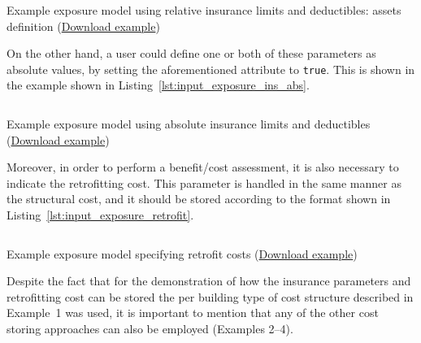 \begin{listing}[htbp]
  \inputminted[firstline=22,firstnumber=22,lastline=32,fontsize=\footnotesize,frame=single,linenos,bgcolor=lightgray]{xml}{oqum/risk/Verbatim/input_exposure_ins_rel.xml}
  \caption{Example exposure model using relative insurance limits and deductibles: assets definition (\href{https://raw.githubusercontent.com/GEMScienceTools/oq-engine-docs/master/oqum/risk/verbatim/input_exposure_ins_rel.xml}{Download example})}
  \label{lst:input_exposure_ins_rel_assets}
\end{listing}

On the other hand, a user could define one or both of these parameters as
absolute values, by setting the aforementioned attribute to \Verb+true+. This
is shown in the example shown in Listing~\ref{lst:input_exposure_ins_abs}.

\begin{listing}[htbp]
  \inputminted[firstline=1,firstnumber=1,fontsize=\footnotesize,frame=single,linenos,bgcolor=lightgray]{xml}{oqum/risk/Verbatim/input_exposure_ins_abs.xml}
  \caption{Example exposure model using absolute insurance limits and deductibles (\href{https://raw.githubusercontent.com/GEMScienceTools/oq-engine-docs/master/oqum/risk/verbatim/input_exposure_ins_abs.xml}{Download example})}
  \label{lst:input_exposure_ins_abs}
\end{listing}

Moreover, in order to perform a benefit/cost assessment, it is also necessary
to indicate the retrofitting cost. This parameter is handled in the same
manner as the structural cost, and it should be stored according to the format
shown in Listing~\ref{lst:input_exposure_retrofit}.

\begin{listing}[htbp]
  \inputminted[firstline=1,firstnumber=1,fontsize=\footnotesize,frame=single,linenos,bgcolor=lightgray]{xml}{oqum/risk/Verbatim/input_exposure_retrofit.xml}
  \caption{Example exposure model specifying retrofit costs (\href{https://raw.githubusercontent.com/GEMScienceTools/oq-engine-docs/master/oqum/risk/verbatim/input_exposure_retrofit.xml}{Download example})}
  \label{lst:input_exposure_retrofit}
\end{listing}

Despite the fact that for the demonstration of how the insurance parameters
and retrofitting cost can be stored the per building type of cost structure
described in Example~1 was used, it is important to mention that any of the
other cost storing approaches can also be employed (Examples 2--4).


